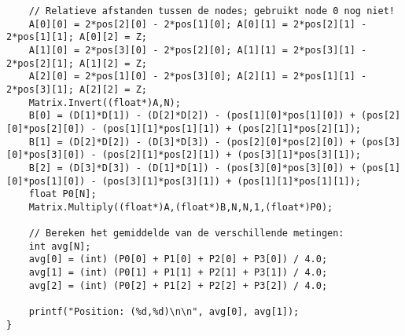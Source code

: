 \begin{lstlisting}
    // Relatieve afstanden tussen de nodes; gebruikt node 0 nog niet!
    A[0][0] = 2*pos[2][0] - 2*pos[1][0]; A[0][1] = 2*pos[2][1] - 2*pos[1][1]; A[0][2] = Z;
    A[1][0] = 2*pos[3][0] - 2*pos[2][0]; A[1][1] = 2*pos[3][1] - 2*pos[2][1]; A[1][2] = Z;
    A[2][0] = 2*pos[1][0] - 2*pos[3][0]; A[2][1] = 2*pos[1][1] - 2*pos[3][1]; A[2][2] = Z;
    Matrix.Invert((float*)A,N);
    B[0] = (D[1]*D[1]) - (D[2]*D[2]) - (pos[1][0]*pos[1][0]) + (pos[2][0]*pos[2][0]) - (pos[1][1]*pos[1][1]) + (pos[2][1]*pos[2][1]);
    B[1] = (D[2]*D[2]) - (D[3]*D[3]) - (pos[2][0]*pos[2][0]) + (pos[3][0]*pos[3][0]) - (pos[2][1]*pos[2][1]) + (pos[3][1]*pos[3][1]);
    B[2] = (D[3]*D[3]) - (D[1]*D[1]) - (pos[3][0]*pos[3][0]) + (pos[1][0]*pos[1][0]) - (pos[3][1]*pos[3][1]) + (pos[1][1]*pos[1][1]);
    float P0[N];
    Matrix.Multiply((float*)A,(float*)B,N,N,1,(float*)P0);
    
    // Bereken het gemiddelde van de verschillende metingen:
    int avg[N];
    avg[0] = (int) (P0[0] + P1[0] + P2[0] + P3[0]) / 4.0;
    avg[1] = (int) (P0[1] + P1[1] + P2[1] + P3[1]) / 4.0;
    avg[2] = (int) (P0[2] + P1[2] + P2[2] + P3[2]) / 4.0;
  
    printf("Position: (%d,%d)\n\n", avg[0], avg[1]);
}
\end{lstlisting}
